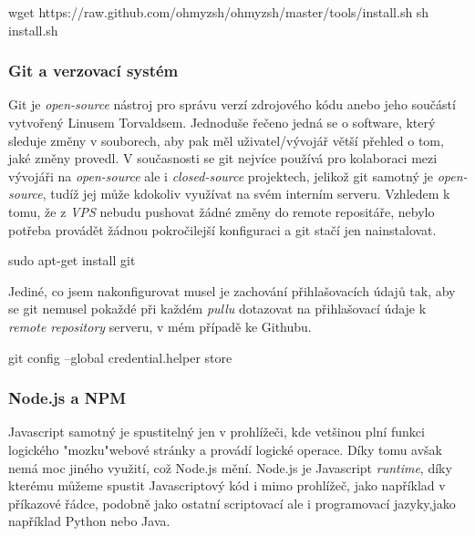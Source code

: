\documentclass[12pt,a4paper]{report}
\begin{document}
  \begin{bash}
    wget https://raw.github.com/ohmyzsh/ohmyzsh/master/tools/install.sh
    sh install.sh
  \end{bash}

  \subsubsection{Git a verzovací systém}
  Git je \emph{open-source} nástroj pro správu verzí zdrojového kódu anebo jeho součástí vytvořený Linusem Torvaldsem. 
  Jednoduše řečeno jedná se o software, který sleduje změny v souborech, aby pak měl uživatel/vývojář 
  větší přehled o tom, jaké změny provedl. V současnosti se git nejvíce používá pro kolaboraci mezi vývojáři na \emph{open-source}
   ale i \emph{closed-source} projektech, jelikož git samotný je \emph{open-source}, tudíž jej může kdokoliv využívat na svém interním serveru.
  Vzhledem k tomu, že z \emph{VPS} nebudu pushovat žádné změny do remote repositáře, nebylo potřeba provádět žádnou pokročilejší konfiguraci 
  a git stačí jen nainstalovat.
  \begin{bash}
    sudo apt-get install git
  \end{bash}
  Jediné, co jsem nakonfigurovat musel je zachování přihlašovacích údajů tak, aby se git nemusel pokaždé při každém \emph{pullu} dotazovat
   na přihlašovací údaje k \emph{remote repository} serveru, v mém případě ke Githubu.
  \begin{bash}
    git config --global credential.helper store
  \end{bash}
  \subsubsection{Node.js a NPM}
  Javascript samotný je spustitelný jen v prohlížeči, kde vetšinou plní funkci logického "mozku"\space webové stránky a provádí logické operace. 
  Díky tomu avšak nemá moc jiného využití, což Node.js mění.
  Node.js je Javascript \emph{runtime}, díky kterému můžeme spustit Javascriptový 
  kód i mimo prohlížeč, jako například v příkazové řádce, podobně jako ostatní scriptovací ale i programovací jazyky,jako například Python nebo Java.
 
\end{document}

